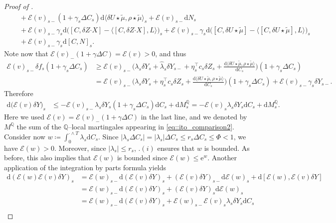 \documentclass[10pt]{article} %
\newcommand\cE{\mathcal E}
\def \Q{\mathbb{Q}}
\newcommand{\bcdot}{\boldsymbol{\cdot}}
\def\d{\mathrm{d}}
\begin{document}
\begin{proof}[Proof of ]
\begin{align}
		&\quad + \cE(v)_{s-}(1+\gamma_s \Delta C_s)\d \langle \delta U \star\tilde\mu,\rho\star\tilde\mu\rangle_s  + \cE(v)_{s-}\d N_s \nonumber\\
		&\quad + \cE(v)_{s-}\gamma_s \d\big([C,\delta Z \bcdot X]-\big\langle [C,\delta Z \bcdot X],L \big\rangle\big)_s + \cE(v)_{s-}\gamma_s \d\big([C,\delta U \star\tilde\mu]-\big\langle [C,\delta U \star\tilde\mu],L \big\rangle\big)_s \nonumber\\
		&\quad + \cE(v)_{s-}\gamma_s \d [C,N]_s.
	\end{align}
	Note now that $\cE(v)_{-}(1+\gamma\Delta C) = \cE(v) > 0$, and thus
	\begin{align*}
		\cE(v)_{s-}\delta f_s(1+\gamma_s\Delta C_s) 
		&\geq \cE(v)_{s-}\bigg(\lambda_s\delta Y_s + \widehat\lambda_s\delta Y_{s-} + \eta^\top_s c_s \delta Z_s + \frac{\d\langle \delta U \star\tilde\mu, \rho\star\tilde\mu\rangle}{\d C_s}\bigg)(1+\gamma_s\Delta C_s) \\
		&= \cE(v)_{s-}\bigg(\lambda_s\delta Y_s + \eta^\top_s c_s \delta Z_s + \frac{\d\langle \delta U \star\tilde\mu, \rho\star\tilde\mu\rangle}{\d C_s}\bigg)(1+\gamma_s\Delta C_s) + \cE(v)_{s-}\gamma_s\delta Y_{s-}.
	\end{align*}
	Therefore
	\begin{align*}
		\d \big(\cE(v)\delta Y\big)_s 
		& \leq - \cE(v)_{s-}\lambda_s \delta Y_s (1+\gamma_s\Delta C_s) \d C_s + \d M^\Q_s  = - \cE(v)_s\lambda_s \delta Y_s \d C_s + \d M^\Q_s.
	\end{align*}
	Here we used $\cE(v) = \cE(v)_-(1+\gamma\Delta C)$ in the last line, and we denoted by $M^\Q$ the sum of the $\Q$--local martingales appearing in \eqref{eq::ito_comparison2}. Consider now $w \coloneqq \int_0^{\cdot \land T} \lambda_s \d C_s$. Since $|\lambda_s \Delta C_s| = |\lambda_s|\Delta C_s \leq r_s \Delta C_s \leq \Phi < 1$, we have $\cE(w) > 0$. Moreover, since $|\lambda_s| \leq r_s$, .$(i)$ ensures that $w$ is bounded. As before, this also implies that $\cE(w)$ is bounded since $\cE(w)\leq\mathrm{e}^w$. Another application of the integration by parts formula yields
	\begin{align*}
		\d (\cE(w)\cE(v)\delta Y)_s 
		&= \cE(w)_{s-}\d (\cE(v)\delta Y)_s + (\cE(v)\delta Y)_{s-}\d \cE(w)_s + \d [\cE(w),\cE(v)\delta Y] \\
		&= \cE(w)_{s-}\d (\cE(v)\delta Y)_s + (\cE(v)\delta Y)_s\d \cE(w)_s \\
		&= \cE(w)_{s-}\d (\cE(v)\delta Y)_s + \cE(w)_{s-}\cE(v)_s \lambda_s \delta Y_s\d C_s \\

\end{align*}
\end{proof}
\end{document}
